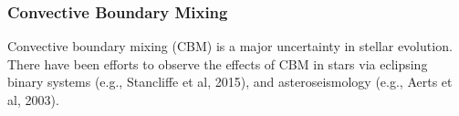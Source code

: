 {\color{purple}
\subsubsection{Convective Boundary Mixing}
}

Convective boundary mixing (CBM) is a major uncertainty in stellar evolution. There have been efforts to observe the effects of CBM in stars via eclipsing binary systems (e.g., Stancliffe et al, 2015), and asteroseismology (e.g., Aerts et al, 2003).

